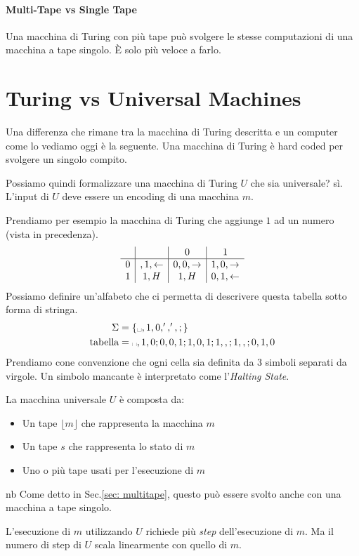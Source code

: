 \documentclass{article}
\begin{document}
\paragraph{Multi-Tape vs Single Tape}
Una macchina di Turing con più tape può svolgere le stesse computazioni di una macchina a tape singolo. È solo più veloce a farlo.

\section{Turing vs Universal Machines}
Una differenza che rimane tra la macchina di Turing descritta e un computer come lo vediamo oggi è la seguente. Una macchina di Turing è hard coded per svolgere un singolo compito.

Possiamo quindi formalizzare una macchina di Turing $U$ che sia universale? sì. \\
L'input di $U$ deve essere un encoding di una macchina $m$.

Prendiamo per esempio la macchina di Turing che aggiunge $1$ ad un numero (vista in precedenza).
\[
    \begin{array}{c|c|c|c}
        & \textvisiblespace & 0 & 1 \\
        \hline
        0 & \textvisiblespace,1,\leftarrow & 0,0,\rightarrow & 1,0,\rightarrow \\
        1 & 1,H & 1, H & 0,1,\leftarrow
    \end{array}
\]
Possiamo definire un'alfabeto che ci permetta di descrivere questa tabella sotto forma di stringa.
\begin{align*}
    \Sigma &= \{\text{\textvisiblespace},1,0,',',;\} \\
    \text{tabella}&=\text{\textvisiblespace},1,0;0,0,1;1,0,1;1,,;1,,;0,1,0
\end{align*}
Prendiamo cone convenzione che ogni cella sia definita da 3 simboli separati da virgole. Un simbolo mancante è interpretato come l'\textit{Halting State}.

La macchina universale $U$ è composta da:
\begin{itemize}
    \item Un tape $\lfloor m\rfloor$ che rappresenta la macchina $m$
    \item Un tape $s$ che rappresenta lo stato di $m$
    \item Uno o più tape usati per l'esecuzione di $m$
\end{itemize}
\begin{callout}{nb}
    Come detto in Sec.\ref{sec: multitape}, questo può essere svolto anche con una macchina a tape singolo.
\end{callout}
L'esecuzione di $m$ utilizzando $U$ richiede più \textit{step} dell'esecuzione di $m$. Ma il numero di step di $U$ scala linearmente con quello di $m$.
\end{document}
